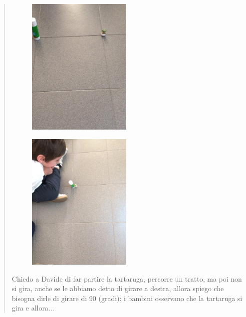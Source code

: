 \begin{quote}
\begin{minipage}{0.4\textwidth}
\begin{figure}[H]
   \includegraphics[width=5.0cm,trim=4 4 6 4,clip]{./images/cerchio/PiccolomanualeLibreLogo5-img2.jpg}
   \label{cer-1}
\end{figure}
\end{minipage} \hfill
\begin{minipage}{0.4\textwidth}
\begin{figure}[H]
   \includegraphics[width=5.0cm,trim=4 4 6 4,clip]{./images/cerchio/PiccolomanualeLibreLogo5-img3.jpg}
   \label{cer-2}
\end{figure}
\end{minipage} \hfill

Chiedo a Davide di far partire la tartaruga, percorre un tratto, ma poi non si gira, anche se le abbiamo detto di girare a destra, allora spiego che bisogna dirle di girare di 90 (gradi): i bambini osservano che la tartaruga si gira e allora... 

\vskip 1cm


\end{quote}
